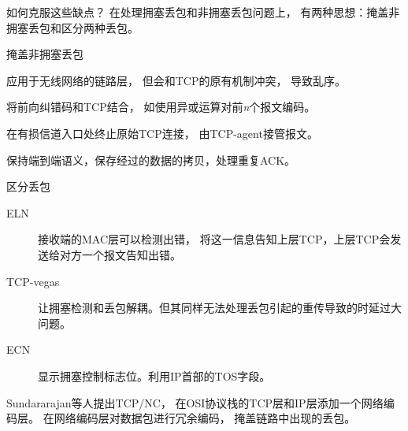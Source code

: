 \begin{frame}[t,allowframebreaks]{如何克服这些缺点？}
	在处理拥塞丢包和非拥塞丢包问题上，
	有两种思想：掩盖非拥塞丢包和区分两种丢包。
	\vspace{1em}
	\begin{block}{掩盖非拥塞丢包}
		\begin{description}
			\footnotesize
			\item[ARQ] 应用于无线网络的链路层，
			但会和TCP的原有机制冲突，
			导致乱序。
			\item[FEC] 将前向纠错码和TCP结合，
			如使用异或运算对前\emph{n}个报文编码。
			\item[Indirect-TCP] 在有损信道入口处终止原始TCP连接，
			由TCP-agent接管报文。
			\item[TCP-snoop] 保持端到端语义，保存经过的数据的拷贝，处理重复ACK。
		\end{description}
	\end{block}
	\begin{block}{区分丢包}
		\footnotesize
		\begin{description}
			\item[ELN] 接收端的MAC层可以检测出错，
			将这一信息告知上层TCP，上层TCP会发送给对方一个报文告知出错。
			\item[TCP-vegas] 让拥塞检测和丢包解耦。但其同样无法处理丢包引起的重传导致的时延过大问题。
			\item[ECN] 显示拥塞控制标志位。利用IP首部的TOS字段。
		\end{description}
	\end{block}
	Sundararajan等人提出TCP/NC，
	在OSI协议栈的TCP层和IP层添加一个网络编码层。
	在网络编码层对数据包进行冗余编码，
	掩盖链路中出现的丢包。
\end{frame}
